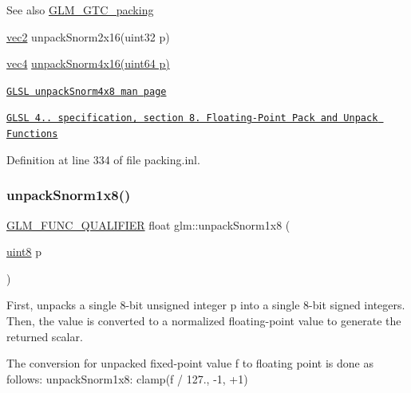 \begin{DoxySeeAlso}{See also}
\hyperlink{group__gtc__packing}{G\+L\+M\+\_\+\+G\+T\+C\+\_\+packing} 

\hyperlink{group__core__types_gaa1618f51db67eaa145db101d8c8431d8}{vec2} unpack\+Snorm2x16(uint32 p) 

\hyperlink{group__core__types_ga5881b1b022d7fd1b7218f5916532dd02}{vec4} \hyperlink{namespaceglm_a1bfaa3f217fd7a4b6b9d3117ecb3fcac}{unpack\+Snorm4x16(uint64 p)} 

\href{http://www.opengl.org/sdk/docs/manglsl/xhtml/unpackSnorm1x16.xml}{\tt G\+L\+SL unpack\+Snorm4x8 man page} 

\href{http://www.opengl.org/registry/doc/GLSLangSpec.4.20.8.pdf}{\tt G\+L\+SL 4.. specification, section 8. Floating-\/\+Point Pack and Unpack Functions} 
\end{DoxySeeAlso}


Definition at line 334 of file packing.\+inl.

\mbox{\label{group__gtc__packing_ga6f2bebf536fbf7c8b97d4b306bb3354e}} 
\subsubsection{\texorpdfstring{unpack\+Snorm1x8()}{unpackSnorm1x8()}}
{\footnotesize\ttfamily \hyperlink{setup_8hpp_a33fdea6f91c5f834105f7415e2a64407}{G\+L\+M\+\_\+\+F\+U\+N\+C\+\_\+\+Q\+U\+A\+L\+I\+F\+I\+ER} float glm\+::unpack\+Snorm1x8 (\begin{DoxyParamCaption}\item[{\hyperlink{group__gtc__type__precision_ga1a7dcd8aac97cc8020817c94049deff2}{uint8}}]{p }\end{DoxyParamCaption})}

First, unpacks a single 8-\/bit unsigned integer p into a single 8-\/bit signed integers. Then, the value is converted to a normalized floating-\/point value to generate the returned scalar.

The conversion for unpacked fixed-\/point value f to floating point is done as follows\+: unpack\+Snorm1x8\+: clamp(f / 127., -\/1, +1)

